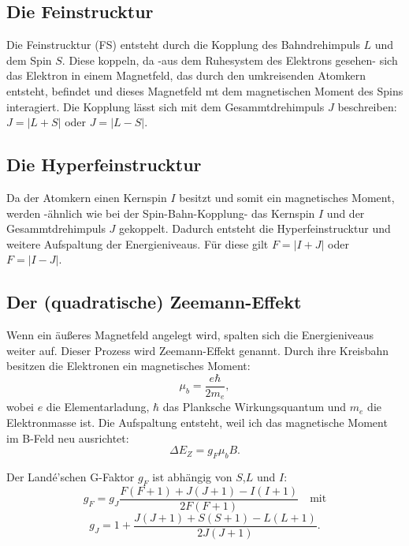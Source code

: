 \subsection{Die Feinstrucktur}
\noindent Die Feinstrucktur (FS) entsteht durch die Kopplung des Bahndrehimpuls $L$ 
und dem Spin $S$. 
Diese koppeln, da 
-aus dem Ruhesystem des Elektrons gesehen-
sich das Elektron in einem Magnetfeld, 
das durch den umkreisenden Atomkern entsteht, befindet
und dieses Magnetfeld mt dem magnetischen Moment des Spins interagiert.
Die Kopplung lässt sich mit dem Gesammtdrehimpuls $J$ beschreiben:
$J= | L + S |$ 
oder 
$J= | L - S |$.

\subsection{Die Hyperfeinstrucktur}
\noindent Da der Atomkern einen Kernspin $I$ besitzt und somit ein magnetisches Moment,
werden -ähnlich wie bei der Spin-Bahn-Kopplung-
das Kernspin $I$ und der Gesammtdrehimpuls $J$ gekoppelt.
Dadurch entsteht die Hyperfeinstrucktur und weitere Aufspaltung der Energieniveaus.
Für diese gilt $F= | I + J |$ oder $F= | I - J|$.

\subsection{Der (quadratische) Zeemann-Effekt}
\noindent Wenn ein äußeres Magnetfeld angelegt wird, 
spalten sich die Energieniveaus weiter auf.
Dieser Prozess wird Zeemann-Effekt genannt.
Durch ihre Kreisbahn besitzen die Elektronen ein magnetisches Moment:
\begin{equation}
    \mu_b = \frac{e \hbar}{2 m_e},
\end{equation}
\noindent wobei $e$ die Elementarladung,
$\hbar$ das Planksche Wirkungsquantum und
$m_e$ die Elektronmasse ist.
Die Aufspaltung entsteht, 
weil ich das magnetische Moment im B-Feld neu ausrichtet:
\begin{equation}
    \label{eq:reso}
   \Delta E_Z = g_F \mu_b B.
\end{equation}

\noindent Der Landé’schen G-Faktor $g_F$ ist abhängig 
von $S$,$L$ und $I$:
\begin{equation}
    \label{eq:g_Faktor}
    g_F= g_J \frac{F \left( F + 1 \right) + J \left( J + 1 \right) 
    - I \left( I + 1 \right)}
    {2 F \left( F + 1 \right)}  \quad \text{mit}
\end{equation}
\begin{equation}
    g_J = 1 + \frac{J \left( J + 1 \right) + S \left( S + 1 \right) 
    - L \left( L + 1 \right)}
    {2 J \left( J + 1 \right)}.
\end{equation}


